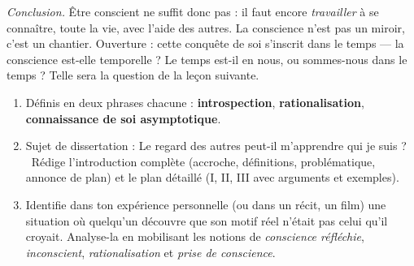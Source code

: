 \documentclass[11pt]{article}
\begin{document}
\begin{exoresolu}
\emph{Conclusion.} Être conscient ne suffit donc pas : il faut encore \emph{travailler} à se connaître, toute la vie, avec l'aide des autres. La conscience n'est pas un miroir, c'est un chantier. Ouverture : cette conquête de soi s'inscrit dans le temps — la conscience est-elle temporelle ? Le temps est-il en nous, ou sommes-nous dans le temps ? Telle sera la question de la leçon suivante.
\end{exoresolu}

\begin{exercice}
\begin{enumerate}
\item Définis en deux phrases chacune : \textbf{introspection}, \textbf{rationalisation}, \textbf{connaissance de soi asymptotique}.
\item Sujet de dissertation : \guillemotleft Le regard des autres peut-il m'apprendre qui je suis ? \guillemotright\ Rédige l'introduction complète (accroche, définitions, problématique, annonce de plan) et le plan détaillé (I, II, III avec arguments et exemples).
\item Identifie dans ton expérience personnelle (ou dans un récit, un film) une situation où quelqu'un découvre que son motif réel n'était pas celui qu'il croyait. Analyse-la en mobilisant les notions de \emph{conscience réfléchie}, \emph{inconscient}, \emph{rationalisation} et \emph{prise de conscience}.
\end{enumerate}
\end{exercice}
\end{document}
